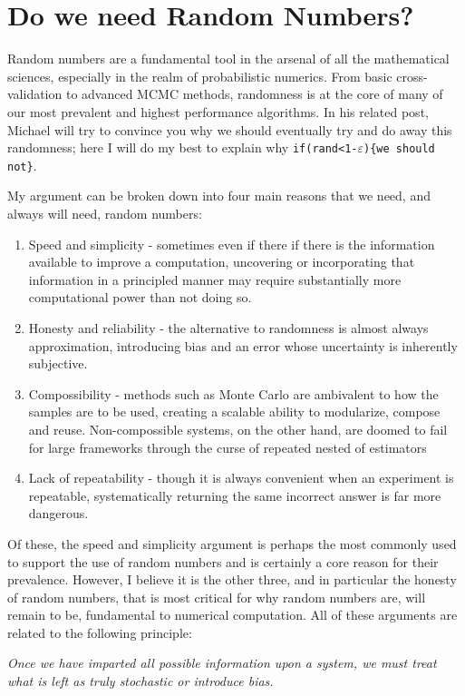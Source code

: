 \section{Do we need Random Numbers?}
	
Random numbers are a fundamental tool in the arsenal of all the mathematical sciences, especially in the realm of 
probabilistic numerics.  From basic cross-validation to advanced MCMC methods, randomness is at the core of 
many of our most prevalent and highest performance algorithms.  In his related post, Michael will 
try to convince you why we should eventually try and do away this randomness; here I will do my best to explain why
\texttt{if(rand<1-$\varepsilon$)\{we should not\}}.

My argument can be broken down into four main reasons that we need, and always will need, random numbers:
\begin{enumerate}
	\item Speed and simplicity - sometimes even if there if there is the information available to improve a computation, 
	uncovering or incorporating that information in a principled manner may require substantially more computational 
	power than not doing so.
	\item Honesty and reliability - the alternative to randomness is almost always approximation, introducing bias 
	and an error whose uncertainty is inherently subjective.
	\item Compossibility - methods such as Monte Carlo are ambivalent to how the samples are to be used, creating 
	a scalable ability to modularize, compose and reuse.  Non-compossible systems, on the other hand, are doomed to fail
	for large frameworks through the curse of repeated nested of estimators~\citep{rainforth2017pitfalls}
	\item Lack of repeatability - though it is always convenient when an experiment is repeatable, systematically 
	returning the same incorrect answer is far more dangerous.
\end{enumerate}
Of these, the speed and simplicity argument is perhaps the most commonly used to support the use of random 
numbers and is certainly a core reason for their prevalence.  However, I believe it is the other three, and in 
particular the honesty of random numbers, that is most critical for why random numbers are, will remain to be, 
fundamental to numerical computation.  All of these arguments are related to the following principle:

\emph{Once we have imparted all possible information upon a system, we must treat what is left as truly 
	stochastic or introduce bias.}

